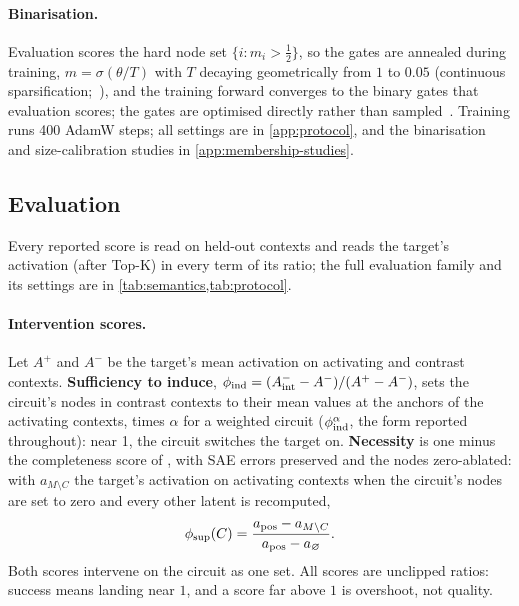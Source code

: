 \documentclass[10pt]{article}
\begin{document}
\paragraph{Binarisation.}
Evaluation scores the hard node set $\{i : m_i > \tfrac{1}{2}\}$, so the gates are annealed during training, $m = \sigma(\theta / T)$ with $T$ decaying geometrically from $1$ to $0.05$ (continuous sparsification;~\citealp{savarese2020winning}), and the training forward converges to the binary gates that evaluation scores; the gates are optimised directly rather than sampled~\citep{louizos2018learning, li2024optimal}.
Training runs 400 AdamW steps; all settings are in \cref{app:protocol}, and the binarisation and size-calibration studies in \cref{app:membership-studies}.

\subsection{Evaluation}
\label{sec:eval}
\label{sec:eval-abl}

Every reported score is read on held-out contexts and reads the target's activation (after Top-K) in every term of its ratio; the full evaluation family and its settings are in \cref{tab:semantics,tab:protocol}.

\paragraph{Intervention scores.}
Let $A^{+}$ and $A^{-}$ be the target's mean activation on activating and contrast contexts.
\textbf{Sufficiency to induce}, $\phi_{\mathrm{ind}} = (A^{-}_{\mathrm{int}} - A^{-})/(A^{+} - A^{-})$, sets the circuit's nodes in contrast contexts to their mean values at the anchors of the activating contexts, times $\alpha$ for a weighted circuit ($\phi_{\mathrm{ind}}^{\alpha}$, the form reported throughout): near 1, the circuit switches the target on.
\textbf{Necessity} is one minus the completeness score of \citet{marks2025sparse}, with SAE errors preserved and the nodes zero-ablated: with $a_{M \setminus C}$ the target's activation on activating contexts when the circuit's nodes are set to zero and every other latent is recomputed,
\[
    \phi_{\mathrm{sup}}(C) = \frac{a_{\mathrm{pos}} - a_{M \setminus C}}{a_{\mathrm{pos}} - a_{\varnothing}}.
\]
Both scores intervene on the circuit as one set.
All scores are unclipped ratios: success means landing near $1$, and a score far above $1$ is overshoot, not quality.
\end{document}
